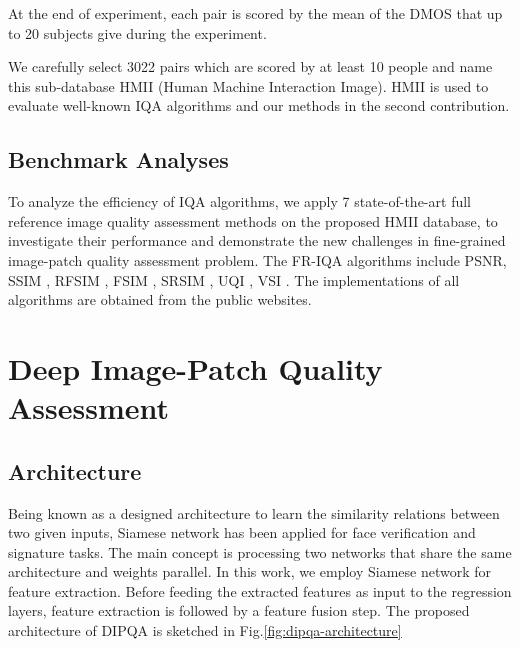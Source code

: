 At the end of experiment, each pair is scored by the mean of the DMOS that up to 20 subjects give during the experiment.

We carefully select 3022 pairs which are scored by at least 10 people and name this sub-database HMII (Human Machine Interaction Image). HMII is used to evaluate well-known IQA algorithms and our methods in the second contribution. 

\subsection{Benchmark Analyses}

To analyze the efficiency of IQA algorithms, we apply 7 state-of-the-art full reference image quality assessment
methods on the proposed HMII database, to investigate
their performance and demonstrate the new challenges in
fine-grained image-patch quality assessment problem. The FR-IQA algorithms include PSNR, SSIM \cite{Wang2004}, RFSIM \cite{Zhang2010}, FSIM \cite{Zhang2011}, SRSIM \cite{Zhang2012}, UQI \cite{Wang2002}, VSI \cite{Zhang2014}. The implementations of all algorithms are obtained from the public websites. 

\section{Deep Image-Patch Quality Assessment}

\subsection{Architecture}

Being known as a designed architecture to learn the similarity relations between two given inputs, Siamese network has been applied for face verification \cite{Chopra2005} and signature \cite{BROMLEY2004} tasks. The main concept is processing two networks that share the same architecture and weights parallel. In this work, we employ Siamese network for feature extraction. Before feeding the extracted features as input to the regression layers, feature extraction is followed by a feature fusion step. The proposed architecture of DIPQA is sketched in Fig.\ref{fig:dipqa-architecture}

